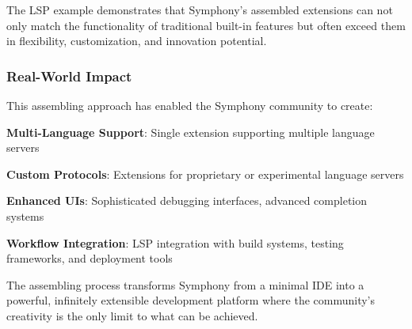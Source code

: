 \begin{alertbox}
The LSP example demonstrates that Symphony's assembled extensions can not only match the functionality of traditional built-in features but often exceed them in flexibility, customization, and innovation potential.
\end{alertbox}

\subsubsection*{Real-World Impact}

This assembling approach has enabled the Symphony community to create:

\begin{compactlist}
    \item \textbf{Multi-Language Support}: Single extension supporting multiple language servers
    \item \textbf{Custom Protocols}: Extensions for proprietary or experimental language servers
    \item \textbf{Enhanced UIs}: Sophisticated debugging interfaces, advanced completion systems
    \item \textbf{Workflow Integration}: LSP integration with build systems, testing frameworks, and deployment tools
\end{compactlist}

The assembling process transforms Symphony from a minimal IDE into a powerful, infinitely extensible development platform where the community's creativity is the only limit to what can be achieved.
